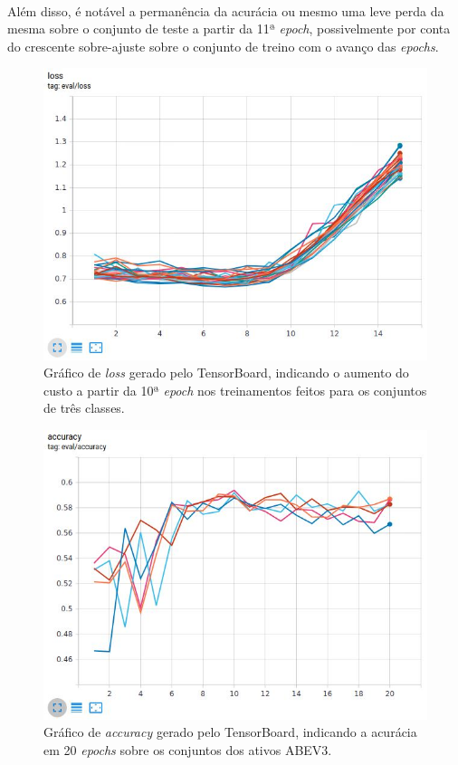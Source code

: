\documentclass[grad,numbers]{coppe}
\begin{document}
		  	\paragraph{}Além disso, é notável a permanência da acurácia ou mesmo uma leve perda da mesma sobre o conjunto de teste a partir da 11ª \textit{epoch}, possivelmente por conta do crescente sobre-ajuste sobre o conjunto de treino com o avanço das \textit{epochs}.
		  	\begin{figure}[H]
		  		\centering
		  		{\includegraphics[width=13.5cm]{loss_graph}
		  			\caption{Gráfico de \textit{loss} gerado pelo TensorBoard, indicando o aumento do custo a partir da 10ª \textit{epoch} nos treinamentos feitos para os conjuntos de três classes.}
		  			\label{fig:loss_graph-fig}}
		  	\end{figure}
			 	\begin{figure}[H]
			 		\centering
			 		{\includegraphics[width=13.5cm]{20e-graph}
			 			\caption{Gráfico de \textit{accuracy} gerado pelo TensorBoard, indicando a acurácia em 20 \textit{epochs} sobre os conjuntos dos ativos ABEV3.}
			 			\label{fig:20e-graph-fig}}
			 	\end{figure}
\end{document}
